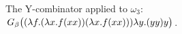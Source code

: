 \begin{figure}[htbp]
{	}
	\caption[$(\lam{f}{(\lam{x}{f (x x)}) (\lam{x}{f (x x)})}) \lam{y}{(y y) y}$]
	{The Y-combinator applied to $\omega_3$: $G_\beta\big((\lambda f.(\lambda x.f (x x)) (\lambda x.f (x x))) \lambda y.(y y) y\big)$.}
	\label{fig:images_YComb_1}
\end{figure}

